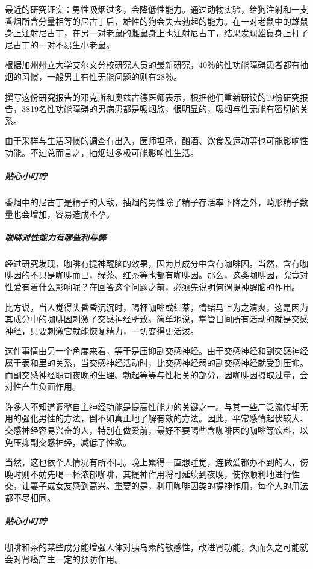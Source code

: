 最近的研究证实：男性吸烟过多，会降低性能力。通过动物实验，给狗注射和一支香烟所含分量相等的尼古丁后，雄性的狗会失去勃起的能力。在一对老鼠中的雄鼠身上注射尼古丁，在另一对老鼠的雌鼠身上也注射尼古丁，结果发现雄鼠身上打了尼古丁的一对不易生小老鼠。

根据加州州立大学艾尔文分校研究人员的最新研究，40％的性功能障碍患者都有抽烟的习惯，一般男士有性无能问题的则有28％。

撰写这份研究报告的邓克斯和奥兹古德医师表示，根据他们重新研读的19份研究报告，3819名性功能障碍的男病患都是吸烟族，很明显的，吸烟与性无能有密切的关系。

由于采样与生活习惯的调查有出入，医师坦承，酗酒、饮食及运动等也可能影响性功能。不过总而言之，抽烟过多极可能影响性生活。

\subparagraph{贴心小叮咛}

香烟中的尼古丁是精子的大敌，抽烟的男性除了精子存活率下降之外，畸形精子数量也会增加，容易造成不孕。

\subparagraph{咖啡对性能力有哪些利与弊}

经过研究发现，咖啡有提神醒脑的效果，因为其成分中含有咖啡因。当然，含有咖啡因的不只是咖啡而已，绿茶、红茶等也都有咖啡因。那么，这类咖啡因，究竟对性爱有着什么影响呢？在回答这个问题之前，必须先说明何谓提神醒脑的作用。

比方说，当人觉得头昏昏沉沉时，喝杯咖啡或红茶，情绪马上为之清爽，这是因为其成分中的咖啡因刺激了交感神经所致。简单地说，掌管日间所有活动的就是交感神经，只要刺激它就能恢复精力，一切变得更活泼。

这件事情由另一个角度来看，等于是压抑副交感神经。由于交感神经和副交感神经属于表和里的关系，当交感神经活动时，比交感神经弱的副交感神经就受到压抑。而副交感神经职司夜晚的生理、勃起等等与性相关的部分，因咖啡因摄取过量，会对性产生负面作用。

许多人不知道调整自主神经功能是提高性能力的关键之一。与其一些广泛流传却无用的强化男性的方法，倒不如真正地了解有效的方法。因此，平常感情起伏较大、交感神经容易兴奋的人，特别在做爱前，最好不要喝些含咖啡因的咖啡等饮料，以免压抑副交感神经，减低了性欲。

当然，这也依个人情况有所不同。晚上累得一直想睡觉，连做爱都办不到的人，傍晚时则不妨先喝一杯浓郁咖啡，其提神作用将可延续到夜晚，使你顺利地进行性交，让妻子或女友感到高兴。重要的是，利用咖啡因类的提神作用，每个人的用法都不尽相同。

\subparagraph{贴心小叮咛}

咖啡和茶的某些成分能增强人体对胰岛素的敏感性，改进肾功能，久而久之可能就会对肾癌产生一定的预防作用。

